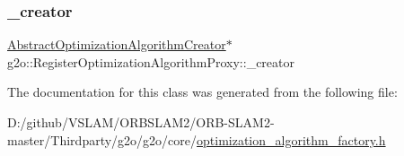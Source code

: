 \subsubsection{\texorpdfstring{\+\_\+creator}{\_creator}}
{\footnotesize\ttfamily \mbox{\hyperlink{classg2o_1_1_abstract_optimization_algorithm_creator}{Abstract\+Optimization\+Algorithm\+Creator}}$\ast$ g2o\+::\+Register\+Optimization\+Algorithm\+Proxy\+::\+\_\+creator\hspace{0.3cm}{\ttfamily [private]}}



The documentation for this class was generated from the following file\+:\begin{DoxyCompactItemize}
\item 
D\+:/github/\+V\+S\+L\+A\+M/\+O\+R\+B\+S\+L\+A\+M2/\+O\+R\+B-\/\+S\+L\+A\+M2-\/master/\+Thirdparty/g2o/g2o/core/\mbox{\hyperlink{optimization__algorithm__factory_8h}{optimization\+\_\+algorithm\+\_\+factory.\+h}}\end{DoxyCompactItemize}
